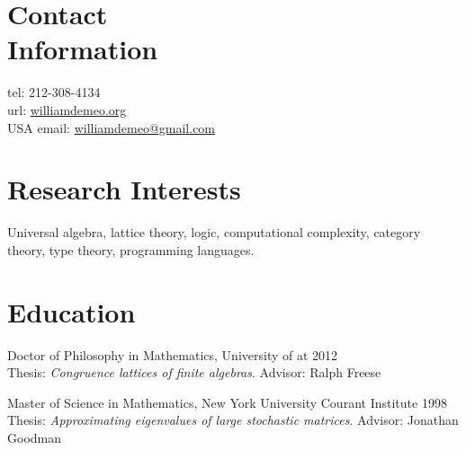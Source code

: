 \documentclass[margin,line]{resume}
\begin{document}
\begin{resume}

    \section{\mysidestyle Contact\\Information}
     \streetaddress   \hfill tel: 212-308-4134\\
     \citystatezip       \hfill url: \href{http://williamdemeo.org}{williamdemeo.org}\\
     {\small USA}             \hfill email: \href{mailto:williamdemeo@gmail.com}{williamdemeo@gmail.com}

     \vspace{-1mm}
     \section{\mysidestyle Research Interests}

     Universal algebra, lattice theory, logic, computational complexity, category theory, type theory, programming languages.

    \vspace{-1mm}
    \section{\mysidestyle Education}

    Doctor of Philosophy in Mathematics, University of \Hawaii at \Manoa \hfill 2012\\    
     Thesis: \textsl{Congruence lattices of finite algebras}. Advisor:  Ralph Freese

    \vspace{-2mm}
    Master of Science in Mathematics, New York University Courant Institute \hfill 1998\\
    Thesis: \textsl{Approximating eigenvalues of large stochastic matrices}. Advisor:  Jonathan Goodman


\end{resume}
\end{document}
